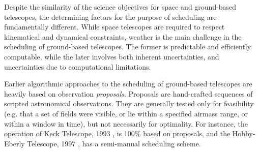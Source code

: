 \documentclass[12pt]{aastex62}
\theoremstyle{definition}
\begin{document}
Despite the similarity of the science objectives for space and ground-based telescopes, the determining factors for the purpose of scheduling are fundamentally different. While space telescopes are required to respect kinematical and dynamical constraints, weather is the main challenge in the scheduling of ground-based telescopes. The former is predictable and efficiently computable, while the later involves both inherent uncertainties, and uncertainties due to computational limitations.

Earlier algorithmic approaches to the scheduling of ground-based telescopes are heavily based on observation \textit{proposals}. Proposals are hand-crafted sequences of scripted astronomical observations. They are generally tested only for feasibility (e.g. that a set of fields were visible, or lie within a specified airmass range, or within a window in time), but not necessarily for optimality. For instance, the operation of Keck Telescope, 1993 \citep{nelson1985design}, is 100\% based on proposals, and the Hobby-Eberly Telescope, 1997 \citep{shetrone2007ten}, has a semi-manual scheduling scheme.
\end{document}
